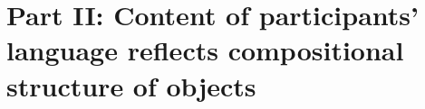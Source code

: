 \documentclass[10pt,letterpaper]{article}
\begin{document}



\section{Part II: Content of participants' language reflects compositional structure of objects}\label{sec-part-ii}
\end{document}

